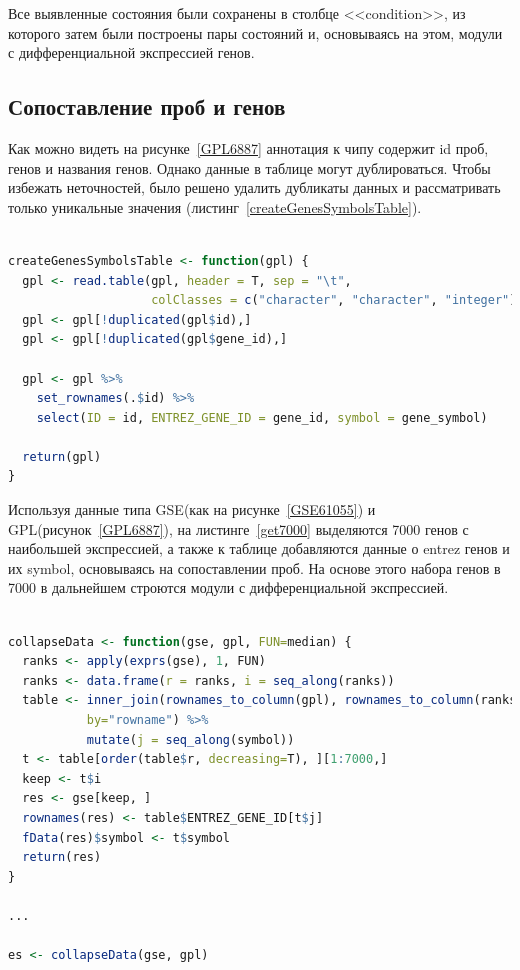\documentclass[times,specification,annotation]{itmo-student-thesis}
\begin{document}
Все выявленные состояния были сохранены в столбце <<condition>>, из которого затем были построены пары состояний и, основываясь на этом, модули с дифференциальной экспрессией генов.

\subsection{Сопоставление проб и генов}

Как можно видеть на рисунке~\ref{GPL6887} аннотация к чипу содержит id проб, генов и названия генов. Однако данные в таблице могут дублироваться. Чтобы избежать неточностей, было решено удалить дубликаты данных и рассматривать только уникальные значения (листинг~\ref{createGenesSymbolsTable}).

\begin{lstlisting}[float=!h, caption={Выделение условий.}, captionpos=b, label={createGenesSymbolsTable}, basicstyle=\footnotesize, language=R]

createGenesSymbolsTable <- function(gpl) {
  gpl <- read.table(gpl, header = T, sep = "\t",
                    colClasses = c("character", "character", "integer"))
  gpl <- gpl[!duplicated(gpl$id),]
  gpl <- gpl[!duplicated(gpl$gene_id),]
  
  gpl <- gpl %>% 
    set_rownames(.$id) %>% 
    select(ID = id, ENTREZ_GENE_ID = gene_id, symbol = gene_symbol)

  return(gpl)
}

\end{lstlisting}

Используя данные типа GSE(как на рисунке~\ref{GSE61055}) и GPL(рисунок~\ref{GPL6887}), на листинге~\ref{get7000} выделяются 7000 генов с наибольшей экспрессией, а также к таблице добавляются данные о entrez генов и их symbol, основываясь на сопоставлении проб. На основе этого набора генов в 7000 в дальнейшем строются модули с дифференциальной экспрессией. 

\begin{lstlisting}[float=!h, caption={Выделение 7000 генов с максимальной экспрессией.}, captionpos=b, label={get7000}, basicstyle=\footnotesize, language=R]

collapseData <- function(gse, gpl, FUN=median) {
  ranks <- apply(exprs(gse), 1, FUN)
  ranks <- data.frame(r = ranks, i = seq_along(ranks))
  table <- inner_join(rownames_to_column(gpl), rownames_to_column(ranks), 
           by="rowname") %>% 
           mutate(j = seq_along(symbol))
  t <- table[order(table$r, decreasing=T), ][1:7000,]
  keep <- t$i
  res <- gse[keep, ]
  rownames(res) <- table$ENTREZ_GENE_ID[t$j]
  fData(res)$symbol <- t$symbol
  return(res)
}

...

es <- collapseData(gse, gpl)

\end{lstlisting}    
\end{document}
